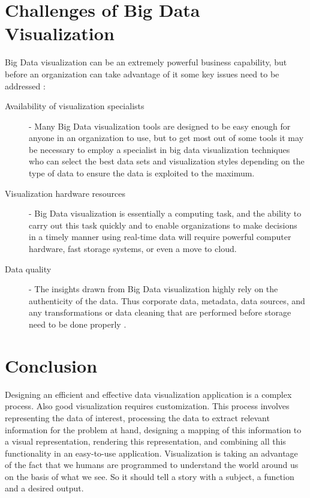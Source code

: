\section{Challenges of Big Data Visualization}

Big Data visualization can be an extremely powerful business capability, but before an organization can take advantage of it some key issues need to be addressed :\\

\begin{description}
 \item[Availability of visualization specialists] - Many Big Data visualization tools are designed to be easy enough for anyone in an organization to use, but to get most out of some tools it may be necessary to employ a specialist in big data visualization techniques who can select the best data sets and visualization styles depending on the type of data to ensure the data is exploited to the maximum.
\item[Visualization hardware resources]- Big Data visualization is essentially a computing task, and the ability to carry out this task quickly and to enable organizations to make decisions in a timely manner using real-time data will require powerful computer hardware, fast storage systems, or even a move to cloud.
\item[Data quality] - The insights drawn from Big Data visualization highly rely on the authenticity of the data. Thus corporate data, metadata, data sources, and any transformations or data cleaning that are performed before storage need to be done properly \cite{extend}.

\end{description}



\section{Conclusion}


Designing an efficient and effective data visualization application is a complex process. Also good visualization requires customization. This process involves representing the data of interest, processing the data to extract relevant information for the problem at hand, designing a mapping of this information to a visual representation, rendering this representation, and combining all this functionality in an easy-to-use application. Visualization is taking an advantage of the fact that we humans are programmed to understand the world around us on the basis of what we see. So it should tell a story with a subject, a function and a desired output.\\

